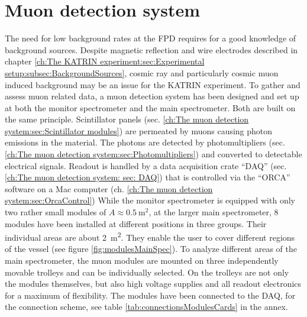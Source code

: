 
\chapter{Muon detection system}
\label{ch:The muon detection system}
  The need for low background rates at the FPD requires for a good knowledge of background sources. Despite magnetic reflection and wire electrodes described in chapter \ref{ch:The KATRIN experiment:sec:Experimental setup:subsec:BackgroundSources}, cosmic ray and particularly cosmic muon induced background may be an issue for the KATRIN experiment. To gather and assess muon related data, a muon detection system has been designed and set up at both the monitor spectrometer and the main spectrometer. Both are built on the same principle. Scintillator panels (sec. \ref{ch:The muon detection system:sec:Scintillator modules}) are permeated by muons causing photon emissions in the material. The photons are detected by photomultipliers (sec. \ref{ch:The muon detection system:sec:Photomultipliers}) and converted to detectable electrical signals. Readout is handled by a data acquisition crate ``DAQ'' (sec. \ref{ch:The muon detection system: sec: DAQ}) that is controlled via the ``ORCA'' software on a Mac computer (ch. \ref{ch:The muon detection system:sec:OrcaControl})
  While the monitor spectrometer is equipped with only two rather small modules of $A \approx \SI{0.5}{\square\meter}$, at the larger main spectrometer, 8 modules have been installed at different positions in three groups. Their individual areas are about \SI{2}{\square\meter}. They enable the user to cover different regions of the vessel (see figure \ref{fig:modulesMainSpec}). To analyze different areas of the main spectrometer, the muon modules are mounted on three independently movable trolleys and can be individually selected. On the trolleys are not only the modules themselves, but also high voltage supplies and all readout electronics for a maximum of flexibility.
  The modules have been connected to the DAQ, for the connection scheme, see table \ref{tab:connectionsModulesCards} in the annex.
  

